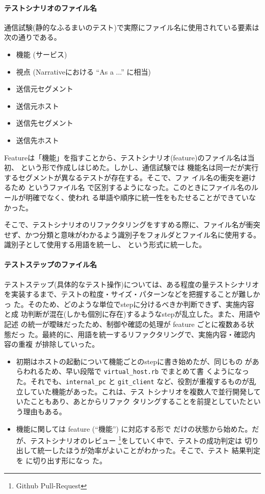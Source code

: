     \paragraph{テストシナリオのファイル名}
通信試験(静的なふるまいのテスト)で実際にファイル名に使用されている要素は
次の通りである。
\begin{itemize}
 \item 機能 (サービス)
 \item 視点 (Narrativeにおける ``As a ...'' に相当)
 \item 送信元セグメント
 \item 送信元ホスト
 \item 送信先セグメント
 \item 送信先ホスト
\end{itemize}
Featureは「機能」を指すことから、テストシナリオ(feature)のファイル名は当
初、 という形で作成しはじめた。しかし、通信試験では
機能名は同一だが実行するセグメントが異なるテストが存在する。そこで、ファ
イル名の衝突を避けるため  というファイル名
で区別するようになった。このときにファイル名のルールが明確でなく、使われ
る単語や順序に統一性をもたせることができていなかった。

そこで、テストシナリオのリファクタリングをすすめる際に、ファイル名が衝突
せず、かつ分類と意味がわかるよう識別子をフォルダとファイル名に使用する。
識別子として使用する用語を統一し、
という形式に統一した。

    \paragraph{テストステップのファイル名}
テストステップ(具体的なテスト操作)については、ある程度の量テストシナリオ
を実装するまで、テストの粒度・サイズ・パターンなどを把握することが難しかっ
た。そのため、どのような単位でstepに分けるべきか判断できず、実施内容と成
功判断が混在(しかも個別に存在)するようなstepが乱立した。また、用語や記述
の統一が曖昧だったため、制御や確認の処理が feature ごとに複数ある状態だっ
た。最終的に、用語を統一するリファクタリングで、実施内容・確認内容の重複
が排除していった。
\begin{itemize}
 \item 初期はホストの起動について機能ごとのstepに書き始めたが、同じもの
       があらわれるため、早い段階で \verb|virtual_host.rb| でまとめて書
       くようになった。それでも、\verb|internal_pc| と \verb|git_client|
       など、役割が重複するものが乱立していた機能があった。これは、テス
       トシナリオを複数人で並行開発していたこともあり、あとからリファク
       タリングすることを前提としていたという理由もある。
 \item 機能に関しては feature (``機能'') に対応する形で だけの状態から始めた。だが、テストシナリオのレビュー
       \footnote{Github Pull-Request}をしていく中で、テストの成功判定は
       切り出して統一したほうが効率がよいことがわかった。そこで、テスト
       結果判定を  に切り出す形になっ
       た。
\end{itemize}

